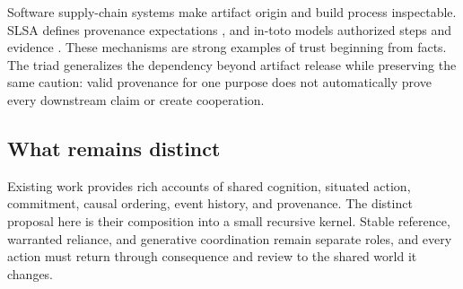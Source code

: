 Software supply-chain systems make artifact origin and build process
inspectable. SLSA defines provenance expectations \cite{slsa}, and in-toto
models authorized steps and evidence \cite{intoto2019}. These mechanisms are
strong examples of trust beginning from facts. The triad generalizes the
dependency beyond artifact release while preserving the same caution: valid
provenance for one purpose does not automatically prove every downstream
claim or create cooperation.

\subsection{What remains distinct}

Existing work provides rich accounts of shared cognition, situated action,
commitment, causal ordering, event history, and provenance. The distinct
proposal here is their composition into a small recursive kernel. Stable
reference, warranted reliance, and generative coordination remain separate
roles, and every action must return through consequence and review to the
shared world it changes.
